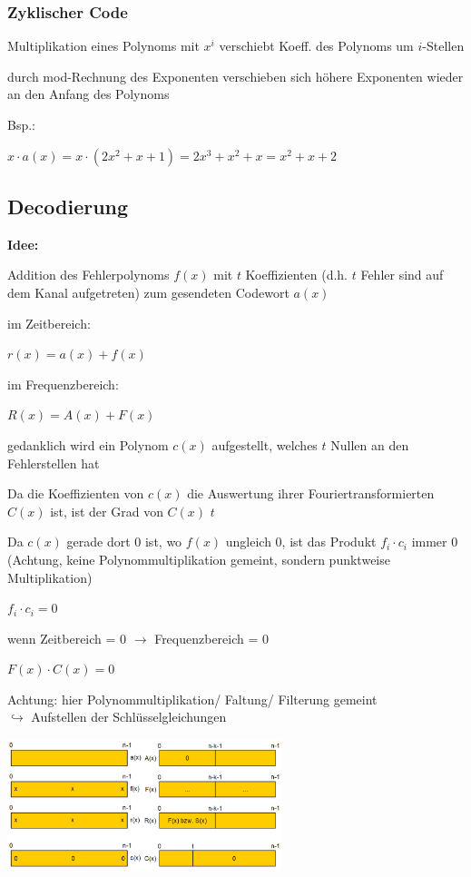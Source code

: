 \subsubsection{Zyklischer Code}

Multiplikation eines Polynoms mit $x^i$ verschiebt Koeff. des Polynoms um $i$-Stellen

durch mod-Rechnung des Exponenten verschieben sich höhere Exponenten wieder an den Anfang des Polynoms

Bsp.:

$\displaystyle{
    x \cdot a(x) = x \cdot ( 2x^2 + x + 1 ) = 2x^3 + x^2 + x = x^2 + x + 2
}$

\subsection{Decodierung}

\textbf{Idee:}

Addition des Fehlerpolynoms $f(x)$ mit $t$ Koeffizienten (d.h. $t$ Fehler sind auf dem Kanal aufgetreten)
zum gesendeten Codewort $a(x)$

im Zeitbereich:

$\displaystyle{
    r(x) = a(x) + f(x)
}$

im Frequenzbereich:

$\displaystyle{
    R(x) = A(x) + F(x)
}$

gedanklich wird ein Polynom $c(x)$ aufgestellt, welches $t$ Nullen an den Fehlerstellen hat

Da die Koeffizienten von $c(x)$ die Auswertung ihrer Fouriertransformierten $C(x)$ ist, ist der Grad
von $C(x)$ $t$

Da $c(x)$ gerade dort 0 ist, wo $f(x)$ ungleich 0, ist das Produkt $f_i \cdot c_i$ immer 0 (Achtung, keine
Polynommultiplikation gemeint, sondern punktweise Multiplikation)

$\displaystyle{
    f_i \cdot c_i = 0
}$

wenn Zeitbereich = 0 $\rightarrow$ Frequenzbereich = 0

$\displaystyle{
    F(x) \cdot C(x) = 0
}$

Achtung: hier Polynommultiplikation/ Faltung/ Filterung gemeint\\
$\hookrightarrow$ Aufstellen der Schlüsselgleichungen

\includegraphics[width=8cm]{img/decod_rs.PNG}

